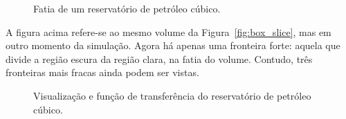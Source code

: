 \begin{figure}[h]
	\centering
	\caption{Fatia de um reservatório de petróleo cúbico.}
\end{figure}

	A figura acima refere-se ao mesmo volume da Figura~\ref{fig:box_slice}, mas em outro momento da simulação. Agora há apenas uma fronteira forte: aquela que divide a região escura da região clara, na fatia do volume. Contudo, três fronteiras mais fracas ainda podem ser vistas.

\begin{figure}[h]
	\centering
	\caption{Visualização e função de transferência do reservatório de petróleo cúbico.}
	\label{fig:r_vrep_2}
\end{figure}

